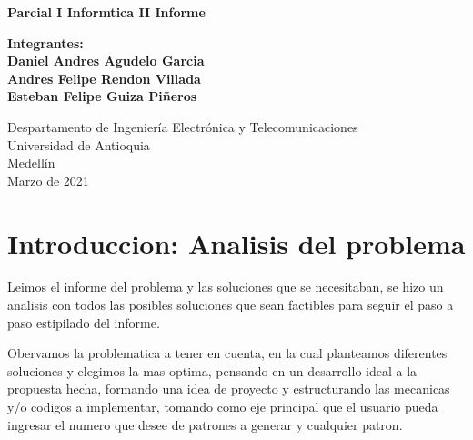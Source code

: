 \documentclass{article}
\begin{document}
\begin{titlepage}
    \begin{center}
        \vspace*{1cm}
            
        \Huge
        \textbf{Parcial I Informtica II Informe}
            
        \vspace{0.5cm}
        \LARGE
            
        \vspace{1.5cm}
            
        \textbf{Integrantes:}
        \\
        \vspace{1.5cm}
        \textbf{Daniel Andres Agudelo Garcia}
        \\
        \textbf{Andres Felipe Rendon Villada} \\
        \textbf{Esteban Felipe Guiza Piñeros}
        
            
        \vfill
            
        \vspace{0.8cm}
            
        \Large
        Despartamento de Ingeniería Electrónica y Telecomunicaciones\\
        Universidad de Antioquia\\
        Medellín\\
        Marzo de 2021
            
    \end{center}
\end{titlepage}

\tableofcontents

\vspace{13cm}

\section{Introduccion: Analisis del problema}

Leimos el informe del problema y las soluciones que se necesitaban, se hizo un analisis con todos las posibles soluciones que sean factibles para seguir el paso a paso estipilado del informe.

 \vspace{1cm}
 
 
Obervamos la problematica a tener en cuenta, en la cual planteamos diferentes soluciones y elegimos la mas optima, pensando en un desarrollo ideal a la propuesta hecha, formando una idea de proyecto y estructurando las mecanicas y/o codigos a implementar, tomando como eje principal que el usuario pueda ingresar el numero que desee de patrones a generar y cualquier patron.
 \vspace{1cm}
\end{document}
